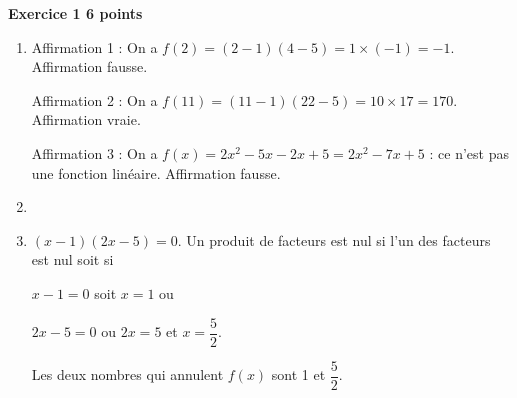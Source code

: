 \textbf{Exercice 1 \hfill 6 points}

\medskip

%
%

\begin{enumerate}
\item %

Affirmation 1 : On a $f(2) = (2 - 1)(4 - 5) = 1 \times (- 1) = - 1$. Affirmation fausse. 

Affirmation 2 : %
On a $f(11) = (11 - 1)(22 - 5) = 10 \times 17 = 170$. Affirmation vraie.

Affirmation 3 : %
On a $f(x) = 2x^2 - 5x - 2x + 5 = 2x^2 - 7x + 5$ : ce n'est pas une fonction linéaire. Affirmation fausse. 
\item  %
\item  %
$(x - 1)(2x - 5) = 0$. Un produit de facteurs est nul si l'un des facteurs est nul soit si 

$x - 1 = 0$ soit $x = 1$ ou

$2x - 5 = 0$ ou $2x  = 5$ et  $x = \dfrac{5}{2}$.

Les deux nombres qui annulent $f(x)$ sont 1 et $\dfrac{5}{2}$. 
\end{enumerate}

\vspace{0.5cm}

